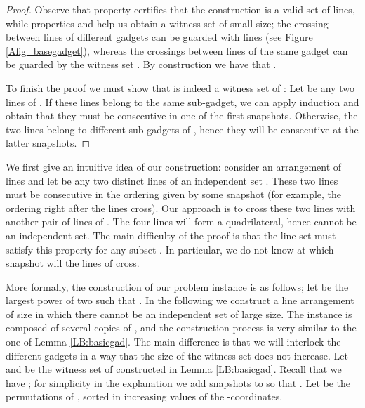 \documentclass[11pt,a4paper]{article}
\begin{document}
\begin{proof}
Observe that property  certifies that the construction is a valid set of lines, while properties  and  help us obtain a witness set  of small size; the crossing between lines of different gadgets  can be guarded with  lines (see Figure \ref{Afig_basegadget}), whereas the crossings between lines of the same gadget can be guarded by the witness set . By construction we have that .

To finish the proof we must show that  is indeed a witness set of : Let  be any two lines of . If these lines belong to the same sub-gadget, we can apply induction and obtain that they must be consecutive in one of the first snapshots. Otherwise, the two lines belong to different sub-gadgets of , hence they will be consecutive at the latter snapshots.
\end{proof}
\fi

We first give an intuitive idea of our construction: consider an arrangement  of  lines and let  be any two distinct lines of an independent set . These two lines must be consecutive in the ordering given by some snapshot (for example, the ordering right after the lines cross). Our approach is to cross these two lines with another pair of lines of . The four lines will form a quadrilateral, hence  cannot be an independent set. The main difficulty of the proof is that the line set must satisfy this property for any subset . In particular, we do not know at which snapshot will the lines of  cross.

More formally, the construction of our problem instance is as follows; let  be the largest power of two such that . In the following we construct a line arrangement of size  in which there cannot be an independent set of large size. The instance is composed of several copies of , and the construction process is very similar to the one of Lemma \ref{LB:basicgad}. The main difference is that we will interlock the  different gadgets in a way that the size of the witness set does not increase. Let  and   be the witness set of  constructed in Lemma \ref{LB:basicgad}. Recall that we have ; for simplicity in the explanation we add snapshots to  so that . Let  be the permutations of , sorted in increasing values of the -coordinates.
\end{document}
